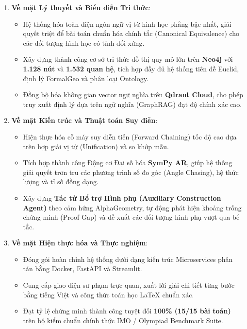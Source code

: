 \begin{enumerate}
    \item \textbf{Về mặt Lý thuyết và Biểu diễn Tri thức}:
    \begin{itemize}
        \item Hệ thống hóa toàn diện ngôn ngữ vị từ hình học phẳng bậc nhất, giải quyết triệt để bài toán chuẩn hóa chính tắc (Canonical Equivalence) cho các đối tượng hình học có tính đối xứng.
        \item Xây dựng thành công cơ sở tri thức đồ thị quy mô lớn trên \textbf{Neo4j} với \textbf{1.128 nút} và \textbf{1.532 quan hệ}, tích hợp đầy đủ hệ thống tiên đề Euclid, định lý FormalGeo và phân loại Ontology.
        \item Đồng bộ hóa không gian vector ngữ nghĩa trên \textbf{Qdrant Cloud}, cho phép truy xuất định lý dựa trên ngữ nghĩa (GraphRAG) đạt độ chính xác cao.
    \end{itemize}

    \item \textbf{Về mặt Kiến trúc và Thuật toán Suy diễn}:
    \begin{itemize}
        \item Hiện thực hóa cỗ máy suy diễn tiến (Forward Chaining) tốc độ cao dựa trên hợp giải vị từ (Unification) và so khớp mẫu.
        \item Tích hợp thành công Động cơ Đại số hóa \textbf{SymPy AR}, giúp hệ thống giải quyết trơn tru các phương trình số đo góc (Angle Chasing), hệ thức lượng và tỉ số đồng dạng.
        \item Xây dựng \textbf{Tác tử Bổ trợ Hình phụ (Auxiliary Construction Agent)} theo cảm hứng AlphaGeometry, tự động phát hiện khoảng trống chứng minh (Proof Gap) và đề xuất các đối tượng hình phụ vượt qua bế tắc.
    \end{itemize}

    \item \textbf{Về mặt Hiện thực hóa và Thực nghiệm}:
    \begin{itemize}
        \item Đóng gói hoàn chỉnh hệ thống dưới dạng kiến trúc Microservices phân tán bằng Docker, FastAPI và Streamlit.
        \item Cung cấp giao diện sư phạm trực quan, xuất lời giải chi tiết từng bước bằng tiếng Việt và công thức toán học LaTeX chuẩn xác.
        \item Đạt tỷ lệ chứng minh thành công tuyệt đối \textbf{100\% (15/15 bài toán)} trên bộ kiểm chuẩn chính thức IMO / Olympiad Benchmark Suite.
    \end{itemize}
\end{enumerate}

